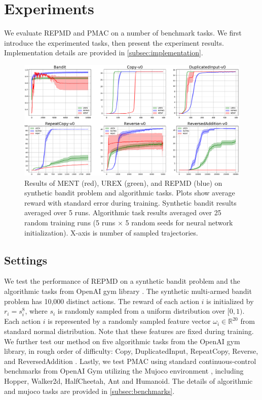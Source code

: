 
\section{Experiments}
\label{sec:experiments}

We evaluate REPMD and PMAC on a number of benchmark tasks. We first introduce the experimented tasks, then present the experiment results. Implementation details are provided in \cref{subsec:implementation}. 

\begin{figure}[t]
\begin{center}
\includegraphics[width=0.75\linewidth]{./fig1.pdf}
\end{center}
\caption{
Results of MENT (red), UREX (green), and REPMD (blue) on synthetic bandit problem and algorithmic tasks. Plots show average reward with standard error during training. Synthetic bandit results averaged over 5 runs. Algorithmic task results averaged over 25 random training runs (5 runs $\times$ 5 random seeds for neural network initialization). X-axis is number of sampled trajectories. } 
\label{fig:results}
\end{figure}

\subsection{Settings}
\label{subsec:tasks}
We test the performance of REPMD on a synthetic bandit problem and the algorithmic tasks from OpenAI gym library \citep{brockman2016openai}. The synthetic multi-armed bandit problem has 10,000 distinct actions. The reward of each action $i$ is initialized by $r_i = s_i^{8}$, where $s_i$ is randomly sampled from a uniform distribution over $[0,1)$. Each action $i$ is represented by a randomly sampled feature vector $\omega_i\in \mathbb{R}^{20}$ from standard normal distribution. Note that these features are fixed during training. We further test our method on five algorithmic tasks from the OpenAI gym library, in rough order of difficulty: Copy, DuplicatedInput, RepeatCopy, Reverse, and ReversedAddition \citep{brockman2016openai}. Lastly, we test PMAC using standard continuous-control benchmarks from OpenAI Gym utilizing the Mujoco environment \citep{brockman2016openai,todorov2012mujoco}, including Hopper, Walker2d, HalfCheetah, Ant and Humanoid. The details of algorithmic and mujoco tasks are provided in \cref{subsec:benchmarks}. 


